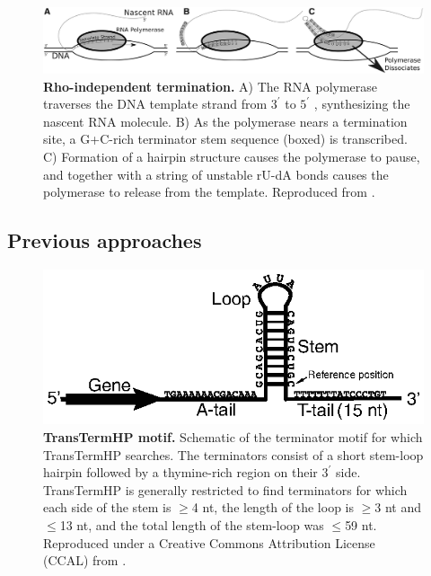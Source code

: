 \begin{figure}[htp]
\begin{center}
\includegraphics[width=14cm]{rhoindy.jpg}
\caption[Rho-independent termination]{\textbf{Rho-independent termination.} A) The RNA polymerase traverses the DNA template strand from $3^\prime$  to $5^\prime$ , synthesizing the nascent RNA molecule. B) As the polymerase nears a termination site, a G+C-rich terminator stem sequence (boxed) is transcribed. C) Formation of a hairpin structure causes the polymerase to pause, and together with a string of unstable rU-dA bonds causes the polymerase to release from the template. Reproduced from \textcite{Gardner2011a}.
} 
\label{fig:rho}
\end{center}
\end{figure}

\subsection{Previous approaches}
\begin{figure}[htp]
\begin{center}
\includegraphics[width=14cm]{transterm}
\caption[TransTermHP motif]{\textbf{TransTermHP motif.} Schematic of the terminator motif for which TransTermHP searches. The terminators consist of a short stem-loop hairpin followed by a thymine-rich region on their $3^\prime$ side. TransTermHP is generally restricted to find terminators for which each side of the stem is $\ge$4 nt, the length of the loop is $\ge$3 nt and $\le$13 nt, and the total length of the stem-loop was $\le$59 nt. Reproduced under a Creative Commons Attribution License (CCAL) from \textcite{Kingsford2007}.
} 
\label{fig:transterm}
\end{center}
\end{figure}
